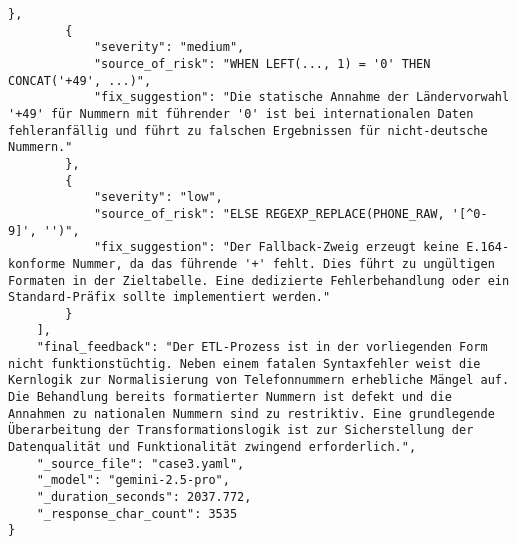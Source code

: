 \begin{lstlisting}[caption={Ausgabe: GEMINI 2.5 Pro Anwendungsfall 3 Konsistenzdurchlauf},label={gemini_case3_prompt2}]
        },
        {
            "severity": "medium",
            "source_of_risk": "WHEN LEFT(..., 1) = '0' THEN CONCAT('+49', ...)",
            "fix_suggestion": "Die statische Annahme der Ländervorwahl '+49' für Nummern mit führender '0' ist bei internationalen Daten fehleranfällig und führt zu falschen Ergebnissen für nicht-deutsche Nummern."
        },
        {
            "severity": "low",
            "source_of_risk": "ELSE REGEXP_REPLACE(PHONE_RAW, '[^0-9]', '')",
            "fix_suggestion": "Der Fallback-Zweig erzeugt keine E.164-konforme Nummer, da das führende '+' fehlt. Dies führt zu ungültigen Formaten in der Zieltabelle. Eine dedizierte Fehlerbehandlung oder ein Standard-Präfix sollte implementiert werden."
        }
    ],
    "final_feedback": "Der ETL-Prozess ist in der vorliegenden Form nicht funktionstüchtig. Neben einem fatalen Syntaxfehler weist die Kernlogik zur Normalisierung von Telefonnummern erhebliche Mängel auf. Die Behandlung bereits formatierter Nummern ist defekt und die Annahmen zu nationalen Nummern sind zu restriktiv. Eine grundlegende Überarbeitung der Transformationslogik ist zur Sicherstellung der Datenqualität und Funktionalität zwingend erforderlich.",
    "_source_file": "case3.yaml",
    "_model": "gemini-2.5-pro",
    "_duration_seconds": 2037.772,
    "_response_char_count": 3535
}
\end{lstlisting}

